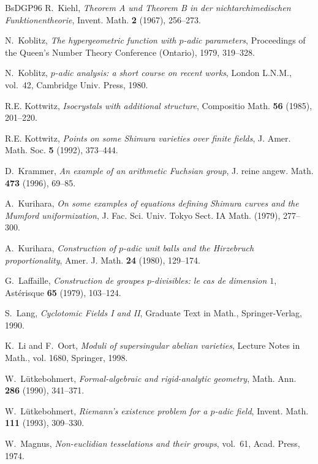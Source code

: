 \begin{thebibliography}{BsDGP96}
R.~Kiehl, \emph{Theorem {A} und {T}heorem {B} in der nichtarchimedischen
  {F}unktionentheorie}, Invent. Math. \textbf{2} (1967), 256--273.

N.~Koblitz, \emph{The hypergeometric function with $p$-adic parameters},
  Proceedings of the Queen's Number Theory Conference (Ontario), 1979,
  319--328.

N.~Koblitz, \emph{$p$-adic analysis: a short course on recent works}, London
  L.N.M., vol.~42, Cambridge Univ. Press, 1980.

R.E. Kottwitz, \emph{Isocrystals with additional structure}, Compositio Math.
  \textbf{56} (1985), 201--220.

R.E. Kottwitz, \emph{Points on some Shimura varieties over finite fields}, J.
  Amer. Math. Soc. \textbf{5} (1992), 373--444.

D.~Krammer, \emph{An example of an arithmetic Fuchsian group}, J. reine angew.
  Math. \textbf{473} (1996), 69--85.

A.~Kurihara, \emph{On some examples of equations defining {S}himura curves and
  the {M}umford uniformization}, J. Fac. Sci. Univ. Tokyo Sect. IA Math.
  (1979), 277--300.

A.~Kurihara, \emph{Construction of $p$-adic unit balls and the {H}irzebruch
  proportionality}, Amer. J. Math. \textbf{24} (1980), 129--174.

G.~Laffaille, \emph{Construction de groupes $p$-divisibles: le cas de dimension
  $1$}, Ast\'erisque \textbf{65} (1979), 103--124.

S.~Lang, \emph{Cyclotomic {F}ields {I} and {I}{I}}, Graduate Text in Math.,
  Springer-Verlag, 1990.

K.~Li and F.~Oort, \emph{Moduli of supersingular abelian varieties}, Lecture
  Notes in Math., vol. 1680, Springer, 1998.

W.~L{\"u}tkebohmert, \emph{Formal-algebraic and rigid-analytic geometry}, Math.
  Ann. \textbf{286} (1990), 341--371.

W.~L{\"u}tkebohmert, \emph{Riemann's existence problem for a $p$-adic field},
  Invent. Math. \textbf{111} (1993), 309--330.

W.~Magnus, \emph{Non-euclidian tesselations and their groups}, vol.~61, Acad.
  Press, 1974.


\end{thebibliography}
